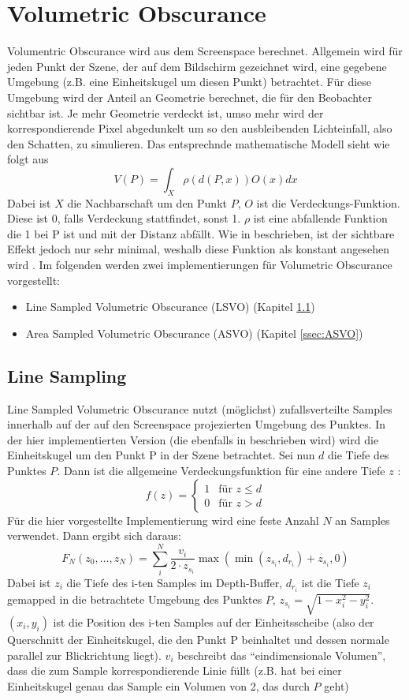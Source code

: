 \documentclass[runningheaders,a4paper]{llncs}
\begin{document}
\section{Volumetric Obscurance}

Volumentric Obscurance wird aus dem Screenspace berechnet. Allgemein wird für jeden Punkt der Szene, der auf
dem Bildschirm gezeichnet wird, eine gegebene Umgebung (z.B. eine Einheitskugel um diesen Punkt) betrachtet.
Für diese Umgebung wird der Anteil an Geometrie berechnet, die für den Beobachter sichtbar ist. Je mehr Geometrie
verdeckt ist, umso mehr wird der korrespondierende Pixel abgedunkelt um so den ausbleibenden Lichteinfall,
also den Schatten, zu simulieren.
Das entsprechnde mathematische Modell sieht wie folgt aus \cite{voPaper}
$$
V(P) = \int_{X} \rho (d(P,x))O(x)dx
$$
Dabei ist $X$ die Nachbarschaft um den Punkt $P$, $O$ ist die Verdeckungs-Funktion. Diese
ist 0, falls Verdeckung stattfindet, sonst 1. $\rho$ ist eine abfallende Funktion
die 1 bei P ist und mit der Distanz abfällt. Wie in \cite{voPaper} beschrieben, ist der 
sichtbare Effekt jedoch nur sehr minimal, weshalb diese Funktion als konstant angesehen 
wird \cite{voPaper}.
Im folgenden werden zwei implementierungen für Volumetric Obscurance vorgestellt:
\begin{itemize}
    \item Line Sampled Volumetric Obscurance (LSVO) (Kapitel \ref{ssec:LSVO})
    \item Area Sampled Volumetric Obscurance (ASVO) (Kapitel \ref{ssec:ASVO})
\end{itemize}

\subsection{Line Sampling} \label{ssec:LSVO}
Line Sampled Volumetric Obscurance nutzt (möglichst) zufallsverteilte Samples innerhalb auf der auf den
Screenspace projezierten Umgebung des Punktes. In der hier implementierten Version (die ebenfalls in
\cite{voPaper} beschrieben wird) wird die Einheitskugel um den Punkt P in der Szene betrachtet.
Sei nun $d$ die Tiefe des Punktes $P$. Dann ist die allgemeine Verdeckungsfunktion für eine andere Tiefe
$z$ :
$$
f(z) = \begin{cases} 1 &  \text{für } z \leq d \\ 0 & \text{für } z > d \end{cases}
$$
Für die hier vorgestellte Implementierung wird eine feste Anzahl $N$ an Samples verwendet.
Dann ergibt sich daraus:
$$
F_{N}(z_0, \dots, z_N) = \sum_i^N \frac{v_i}{2 \cdot z_{s_i}} \max{(\min{(z_{s_i}, d_{r_i})} + z_{s_i}, 0)}
$$
Dabei ist $z_i$ die Tiefe des i-ten Samples im Depth-Buffer, $d_{r_i}$ ist die Tiefe $z_i$ gemapped in die
betrachtete Umgebung des Punktes $P$, $z_{s_i} = \sqrt{1 - x_i^2 - y_i^2}$. $(x_i, y_i)$ ist die Position des
i-ten Samples auf der Einheitsscheibe (also der Querschnitt der Einheitskugel, die den Punkt P 
beinhaltet und dessen normale parallel zur Blickrichtung liegt). $v_i$ beschreibt das ``eindimensionale
Volumen'', dass die zum Sample korrespondierende Linie füllt (z.B. hat bei einer Einheitskugel genau das Sample
ein Volumen von 2, das durch $P$ geht) \newline
\end{document}

